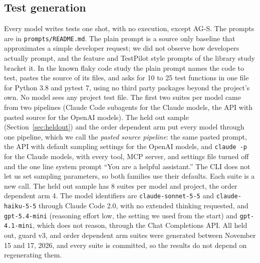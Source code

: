 \subsection{Test generation}
Every model writes tests one shot, with no execution, except AG-S. The prompts are in \texttt{prompts/README.md}. The plain prompt is a source only baseline that approximates a simple developer request; we did not observe how developers actually prompt, and the feature and TestPilot style prompts of the library study bracket it. In the known flaky code study the plain prompt names the code to test, pastes the source of its files, and asks for 10 to 25 test functions in one file for Python 3.8 and pytest 7, using no third party packages beyond the project's own. No model sees any project test file. The first two suites per model came from two pipelines (Claude Code subagents for the Claude models, the API with pasted source for the OpenAI models). The held out sample (Section~\ref{sec:heldout}) and the order dependent arm put every model through one pipeline, which we call the \emph{pasted source pipeline}: the same pasted prompt, the API with default sampling settings for the OpenAI models, and \texttt{claude -p} for the Claude models, with every tool, MCP server, and settings file turned off and the one line system prompt ``You are a helpful assistant.'' The CLI does not let us set sampling parameters, so both families use their defaults. Each suite is a new call. The held out sample has 8 suites per model and project, the order dependent arm 4. The model identifiers are \texttt{claude-sonnet-5-5} and \texttt{claude-haiku-5-5} through Claude Code 2.0, with no extended thinking requested, and \texttt{gpt-5.4-mini} (reasoning effort low, the setting we used from the start) and \texttt{gpt-4.1-mini}, which does not reason, through the Chat Completions API. All held out, guard v3, and order dependent arm suites were generated between November 15 and 17, 2026, and every suite is committed, so the results do not depend on regenerating them.


